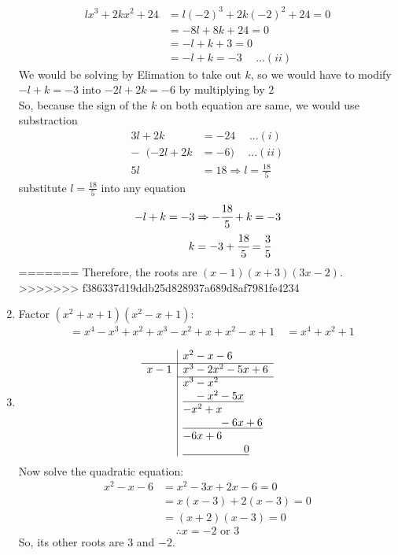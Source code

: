 \begin{multicols}{2}
\begin{enumerate}[label={\textbf{\arabic*.}}]
\begin{align*}
    lx^3 + 2kx^2 + 24 &= l(-2)^3 + 2k(-2)^2 + 24 = 0 \\
    & = -8l + 8k + 24 = 0 \\
    & = -l + k + 3 = 0  \\
    &= -l + k = -3 \hspace{15pt} ...(ii)
  \end{align*}
  We would be solving by Elimation to take out $k$, so we would
  have to modify $-l + k = -3 $ into $-2l + 2k = -6$ by multiplying by $2$ \\
  So, because the sign of the $k$ on both equation are same, we would use substraction \vspace{-8pt}
  \begin{align*}
    3l + 2k &= -24 \hspace{15pt}...(i) \\
    - \hspace{7pt} (-2l + 2k &= -6) \hspace{15pt} ...(ii) \\
    5l & = 18 \Rightarrow l = \frac{18}{5}
  \end{align*}
  substitute $l = \frac{18}{5}$ into any equation \vspace{-10pt}
  \begin{align*}
    -l + k = -3 &\Rightarrow -\cfrac{18}{5} + k = -3 \\
    k &= -3 + \cfrac{18}{5} =\frac{3}{5} \
  \end{align*}
  =======
  Therefore, the roots are \((x-1)(x+3)(3x - 2)\).
  >>>>>>> f386337d19ddb25d828937a689d8af7981fe4234

\item Factor $(x^2 + x + 1)(x^2 - x + 1)$:
  \begin{align*}
    &= x^4 - x^3 + x^2 + x^3 - x^2 + x + x^2 - x + 1 \
    &= x^4 + x^2 + 1
  \end{align*}

\item
  \[
    \begin{array}{r|l}
      & x^2 - x - 6 \\
      \hline
      x - 1 & x^3 - 2x^2 - 5x + 6 \\
      \cline{2-2}
      & x^3 - x^2 \\
      & \underline{\phantom{x^3} - x^2 - 5x} \\
      & - x^2 + x \\
      & \underline{\phantom{x^3 - x^2} - 6x + 6} \\
      & - 6x + 6 \\
      & \underline{\phantom{x^3 - x^2 - 6x} 0}
    \end{array}
  \]
  Now solve the quadratic equation:
  \begin{align*}
    x^2 - x - 6 &= x^2 - 3x + 2x - 6 = 0 \\
    &= x(x - 3) + 2(x - 3) = 0 \\
    &= (x + 2)(x - 3) = 0
  \end{align*}
  \[\therefore x = -2 \text{ or } 3\]
  So, its other roots are \(3\) and \(-2\).



\end{enumerate}
\end{multicols}

